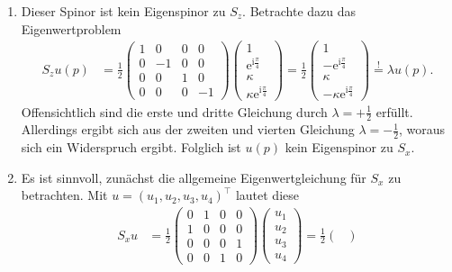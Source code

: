 \documentclass[german, parskip=full]{scrartcl}
\newcommand{\I}{\text{i}}
\newcommand{\e}{\text{e}}
\begin{document}
\begin{enumerate}
\begin{align*}
b&=a\e^{\I\frac{\pi}{4}}=\frac{E-m}{p}(1+\I).
\end{align*}
Definiere $\kappa:=\frac{E-m}{\sqrt{2}p}$.
Dann lautet der Eigenspinor
\begin{align*}
u(p)&=(1,\e^{\I\frac{\pi}{4}},\kappa,\kappa\e^{\I\frac{\pi}{4}})^\top .
\end{align*}
\item[c)] Dieser Spinor ist kein Eigenspinor zu $S_z$.
Betrachte dazu das Eigenwertproblem
\begin{align*}
S_zu(p)&=\frac{1}{2}\begin{pmatrix}
1&0&0&0\\
0&-1&0&0\\
0&0&1&0\\
0&0&0&-1
\end{pmatrix}\begin{pmatrix}
1\\ \e^{\I\frac{\pi}{4}} \\ \kappa \\ \kappa \e^{\I\frac{\pi}{4}}
\end{pmatrix}=\frac{1}{2}\begin{pmatrix}
1\\ -\e^{\I\frac{\pi}{4}} \\ \kappa \\ -\kappa \e^{\I\frac{\pi}{4}}
\end{pmatrix}\overset{!}{=}\lambda u(p).
\end{align*}
Offensichtlich sind die erste und dritte Gleichung durch $\lambda=+\frac{1}{2}$ erfüllt.
Allerdings ergibt sich aus der zweiten und vierten Gleichung $\lambda=-\frac{1}{2}$,  woraus sich ein Widerspruch ergibt.
Folglich ist $u(p)$ kein Eigenspinor zu $S_x$.
\item[d)] Es ist sinnvoll, zunächst die allgemeine Eigenwertgleichung für $S_x$ zu betrachten.
Mit $u=(u_1,u_2,u_3,u_4)^\top$ lautet diese
\begin{align*}
S_xu&=\frac{1}{2}\begin{pmatrix}
0&1&0&0\\
1&0&0&0\\
0&0&0&1\\
0&0&1&0
\end{pmatrix}\begin{pmatrix}
u_1\\ u_2 \\ u_3 \\ u_4
\end{pmatrix}=\frac{1}{2}\begin{pmatrix}

\end{pmatrix}
\end{align*}
\end{enumerate}
\end{document}
